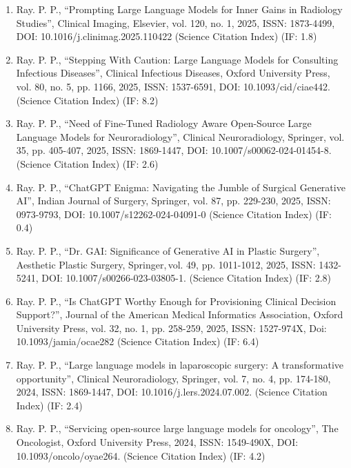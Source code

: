 \documentclass[11pt,a4paper]{moderncv}
\begin{document}
\begin{adjustwidth}{6em}{0pt}
\begin{enumerate}
		\item Ray. P. P., “Prompting Large Language Models for Inner Gains in Radiology Studies”, Clinical Imaging, Elsevier, vol. 120, no. 1, 2025, ISSN: 1873-4499, DOI: 10.1016/j.clinimag.2025.110422 (Science Citation Index) (IF: 1.8)
		
		\item Ray. P. P., “Stepping With Caution: Large Language Models for Consulting Infectious Diseases”, Clinical Infectious Diseases, Oxford University Press, vol. 80, no. 5, pp. 1166, 2025, ISSN: 1537-6591, DOI: 10.1093/cid/ciae442. (Science Citation Index) (IF: 8.2)
		
		\item Ray. P. P., “Need of Fine-Tuned Radiology Aware Open-Source Large Language Models for Neuroradiology”, Clinical Neuroradiology, Springer, vol. 35, pp. 405-407, 2025, ISSN: 1869-1447, DOI: 10.1007/s00062-024-01454-8. (Science Citation Index) (IF: 2.6)
		
		\item Ray. P. P., “ChatGPT Enigma: Navigating the Jumble of Surgical Generative AI”, Indian Journal of Surgery, Springer, vol. 87, pp. 229-230, 2025, ISSN: 0973-9793, DOI: 10.1007/s12262-024-04091-0 (Science Citation Index) (IF: 0.4)
		
		\item Ray. P. P., “Dr. GAI: Significance of Generative AI in Plastic Surgery”, Aesthetic Plastic Surgery, Springer, vol. 49, pp. 1011-1012, 2025, ISSN: 1432-5241, DOI: 10.1007/s00266-023-03805-1. (Science Citation Index) (IF: 2.8)
		
		\item Ray. P. P., “Is ChatGPT Worthy Enough for Provisioning Clinical Decision Support?”, Journal of the American Medical Informatics Association, Oxford University Press, vol. 32, no. 1, pp. 258-259, 2025, ISSN: 1527-974X, Doi: 10.1093/jamia/ocae282 (Science Citation Index) (IF: 6.4)
		
		\item Ray. P. P., “Large language models in laparoscopic surgery: A transformative opportunity”, Clinical Neuroradiology, Springer, vol. 7, no. 4, pp. 174-180, 2024, ISSN: 1869-1447, DOI: 10.1016/j.lers.2024.07.002. (Science Citation Index) (IF: 2.4)
		
		\item Ray. P. P., “Servicing open-source large language models for oncology”, The Oncologist, Oxford University Press, 2024, ISSN: 1549-490X, DOI: 10.1093/oncolo/oyae264. (Science Citation Index) (IF: 4.2)
		

\end{enumerate}
\end{adjustwidth}
\end{document}
